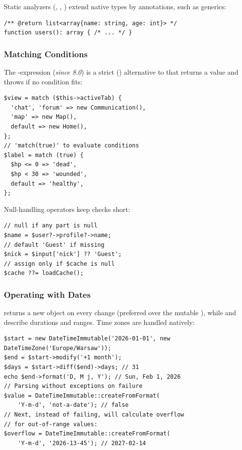 \noindent Static analyzers (, , ) extend native types by
annotations, such as generics:

\begin{lstlisting}
/** @return list<array{name: string, age: int}> */
function users(): array { /* ... */ }
\end{lstlisting}


\subsubsection{Matching Conditions}

The -expression (\emph{since 8.0}) is a strict (\q{===}) alternative to  that
returns a value and throws  if no condition fits:

\begin{lstlisting}
$view = match ($this->activeTab) {
  'chat', 'forum' => new Communication(),
  'map' => new Map(),
  default => new Home(),
};
// 'match(true)' to evaluate conditions
$label = match (true) {
  $hp <= 0 => 'dead',
  $hp < 30 => 'wounded',
  default => 'healthy',
};
\end{lstlisting}

\noindent Null-handling operators keep checks short:

\begin{lstlisting}
// null if any part is null
$name = $user?->profile?->name;
// default 'Guest' if missing
$nick = $input['nick'] ?? 'Guest';
// assign only if $cache is null
$cache ??= loadCache();
\end{lstlisting}


\subsubsection{Operating with Dates}

 returns a new object on every change (preferred over the mutable
), while  and  describe durations and ranges. Time
zones are handled natively:

\begin{lstlisting}
$start = new DateTimeImmutable('2026-01-01', new DateTimeZone('Europe/Warsaw'));
$end = $start->modify('+1 month');
$days = $start->diff($end)->days; // 31
echo $end->format('D, M j, Y'); // Sun, Feb 1, 2026
// Parsing without exceptions on failure
$value = DateTimeImmutable::createFromFormat(
    'Y-m-d', 'not-a-date'); // false
// Next, instead of failing, will calculate overflow
// for out-of-range values:
$overflow = DateTimeImmutable::createFromFormat(
    'Y-m-d', '2026-13-45'); // 2027-02-14
\end{lstlisting}

